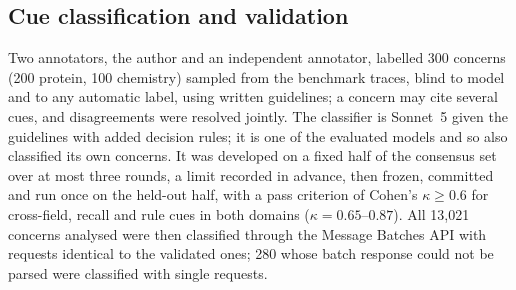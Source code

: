 \subsection*{Cue classification and validation}
Two annotators, the author and an independent annotator, labelled 300 concerns (200 protein, 100 chemistry) sampled from the benchmark traces, blind to model and to any automatic label, using written guidelines; a concern may cite several cues, and disagreements were resolved jointly. The classifier is Sonnet~5 given the guidelines with added decision rules; it is one of the evaluated models and so also classified its own concerns. It was developed on a fixed half of the consensus set over at most three rounds, a limit recorded in advance, then frozen, committed and run once on the held-out half, with a pass criterion of Cohen's $\kappa \ge 0.6$ \cite{cohen1960kappa} for cross-field, recall and rule cues in both domains ($\kappa = 0.65$--$0.87$). All 13,021 concerns analysed were then classified through the Message Batches API with requests identical to the validated ones; 280 whose batch response could not be parsed were classified with single requests.

